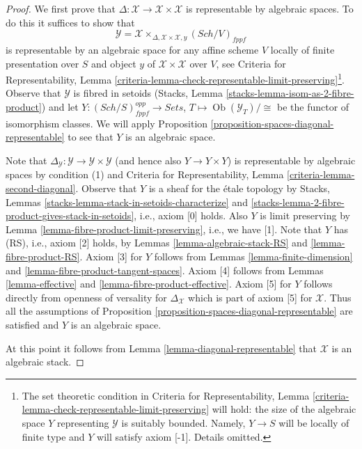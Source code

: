 \documentclass[10pt,a4paper]{amsart}
\theoremstyle{plain}
\theoremstyle{definition}
\theoremstyle{remark}
\numberwithin{equation}{subsection}
\def\Sch{\mathit{Sch}}
\def\Ob{\mathop{\mathrm{Ob}}\nolimits}
\begin{document}
\begin{proof}
We first prove that $\Delta : \mathcal{X} \to \mathcal{X} \times \mathcal{X}$
is representable by algebraic spaces. To do this it suffices to show
that
$$
\mathcal{Y} =
\mathcal{X} \times_{\Delta, \mathcal{X} \times \mathcal{X}, y} (\Sch/V)_{fppf}
$$
is representable by an algebraic space for any affine scheme $V$ locally
of finite presentation over $S$ and object $y$ of
$\mathcal{X} \times \mathcal{X}$ over $V$, see
Criteria for Representability, Lemma
\ref{criteria-lemma-check-representable-limit-preserving}\footnote{The
set theoretic condition in Criteria for Representability, Lemma
\ref{criteria-lemma-check-representable-limit-preserving}
will hold: the size of the algebraic space $Y$ representing $\mathcal{Y}$ is
suitably bounded. Namely, $Y \to S$ will be locally of finite type and $Y$
will satisfy axiom [-1]. Details omitted.}.
Observe that $\mathcal{Y}$ is fibred in setoids
(Stacks, Lemma \ref{stacks-lemma-isom-as-2-fibre-product})
and let $Y : (\Sch/S)_{fppf}^{opp} \to \textit{Sets}$,
$T \mapsto \Ob(\mathcal{Y}_T)/\cong$ be the functor of isomorphism
classes. We will apply
Proposition \ref{proposition-spaces-diagonal-representable}
to see that $Y$ is an algebraic space.

\medskip\noindent
Note that
$\Delta_\mathcal{Y} : \mathcal{Y} \to \mathcal{Y} \times \mathcal{Y}$
(and hence also $Y \to Y \times Y$)
is representable by algebraic spaces by condition (1) and
Criteria for Representability, Lemma \ref{criteria-lemma-second-diagonal}.
Observe that $Y$ is a sheaf for the \'etale topology by
Stacks, Lemmas \ref{stacks-lemma-stack-in-setoids-characterize} and
\ref{stacks-lemma-2-fibre-product-gives-stack-in-setoids}, i.e.,
axiom [0] holds. Also $Y$ is limit preserving by
Lemma \ref{lemma-fibre-product-limit-preserving}, i.e., we have [1].
Note that $Y$ has (RS), i.e., axiom [2] holds, by
Lemmas \ref{lemma-algebraic-stack-RS} and
\ref{lemma-fibre-product-RS}. Axiom [3] for $Y$ follows
from Lemmas \ref{lemma-finite-dimension} and
\ref{lemma-fibre-product-tangent-spaces}.
Axiom [4] follows from Lemmas \ref{lemma-effective} and
\ref{lemma-fibre-product-effective}.
Axiom [5] for $Y$ follows directly from openness of versality
for $\Delta_\mathcal{X}$ which is part of axiom [5] for $\mathcal{X}$.
Thus all the assumptions of
Proposition \ref{proposition-spaces-diagonal-representable}
are satisfied and $Y$ is an algebraic space.

\medskip\noindent
At this point it follows from Lemma \ref{lemma-diagonal-representable}
that $\mathcal{X}$ is an algebraic stack.
\end{proof}
\end{document}
